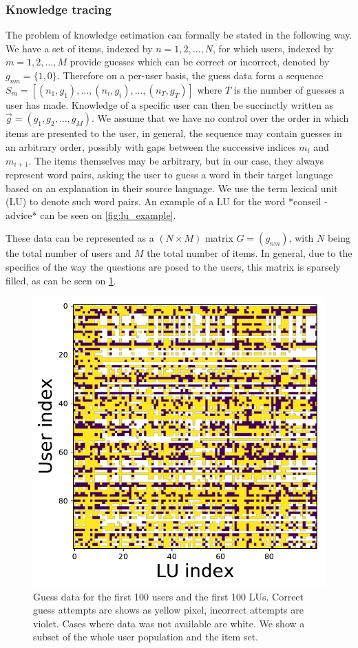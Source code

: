 \subsubsection{Knowledge tracing}
The problem of knowledge estimation can formally be stated in the following way. We have a set of items, indexed by $n = {1, 2, \dots, N}$, for which users, indexed by $m  = {1, 2, \dots, M}$ provide guesses which can be correct or incorrect, denoted by $g_{nm}=\{1, 0\}$. Therefore on a per-user basis, the guess data form a sequence $S_m = [(n_1, g_1), \dots, (n_i, g_i), \dots, (n_T, g_T)]$ where $T$ is the number of guesses a user has made. Knowledge of a specific user can then be succinctly written as $\vec{g} = (g_1, g_2, \dots, g_M)$. We assume that we have no control over the order in which items are presented to the user, in general, the sequence may contain guesses in an arbitrary order, possibly with gaps between the successive indices $m_i$ and $m_{i+1}$. The items themselves may be arbitrary, but in our case, they always represent word pairs, asking the user to guess a word in their target language based on an explanation in their source language. We use the term lexical unit (LU) to denote such word pairs. An example of a LU for the word *conseil - advice* can be seen on \cref{fig:lu_example}.

These data can be represented as a $(N \times M)$ matrix $G = (g_{nm})$, with $N$ being the total number of users and $M$ the total number of items. In general, due to the specifics of the way the questions are posed to the users, this matrix is sparsely filled, as can be seen on \cref{fig:user_data}.

\begin{figure}[ht]
\centering
\includegraphics[width=0.5\linewidth]{figures/lingvist/user_data.pdf}
\caption{Guess data for the first 100 users and the first 100 LUs. Correct guess attempts are shows as yellow pixel, incorrect attempts are violet. Cases where data was not available are white. We show a subset of the whole user population and the item set.} 
\label{fig:user_data} 
\end{figure} 

